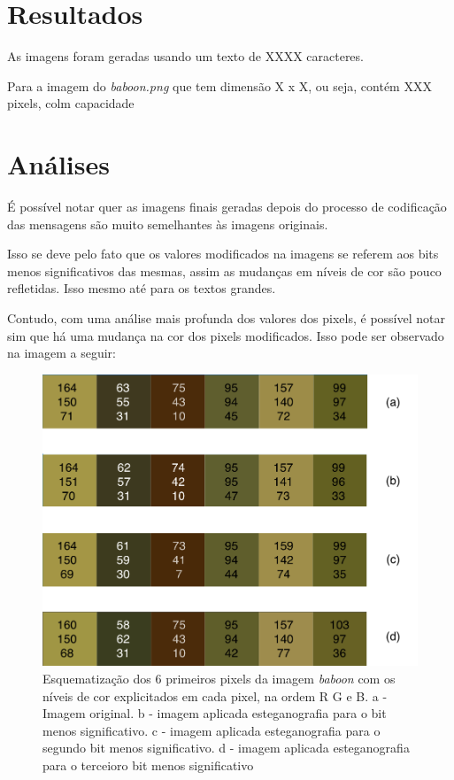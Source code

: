 \documentclass[conference]{IEEEtran}
\begin{document}
\section{Resultados}

    As imagens foram geradas usando um texto de XXXX caracteres.

    Para a imagem do \textit{baboon.png} que tem dimensão X x X, ou seja, contém XXX pixels, colm capacidade


\section{Análises}

    É possível notar quer as imagens finais geradas depois do processo de codificação das mensagens são muito semelhantes às imagens originais.

    Isso se deve pelo fato que os valores modificados na imagens se referem aos bits menos significativos das mesmas, assim as mudanças em níveis de cor são pouco refletidas.
    Isso mesmo até para os textos grandes.

    Contudo, com uma análise mais profunda dos valores dos pixels, é possível notar sim que há uma mudança na cor dos pixels modificados.
    Isso pode ser observado na imagem a seguir:

    \begin{figure}[ht]
        \centering
        \includegraphics[width=\linewidth]{baboonColors.png}
        \caption{Esquematização dos 6 primeiros pixels da imagem \textit{baboon} com os níveis de cor explicitados em cada pixel, na ordem R G e B. a - Imagem original. b - imagem aplicada esteganografia para o bit menos significativo. c - imagem aplicada esteganografia para o segundo bit menos significativo. d - imagem aplicada esteganografia para o terceioro bit menos significativo}
        \label{fig:bbc}
    \end{figure}
\end{document}
